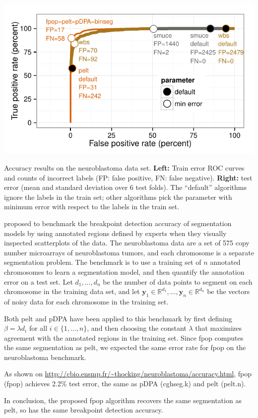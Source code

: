 \documentclass{article}
\newcommand{\RR}{\mathbb R}
\begin{document}
\begin{table}
  \centering
  \parbox{3.5in}{
    \includegraphics[width=\linewidth]{figure-neuroblastoma-roc}
  }
  \parbox{3in}{
    
  }
  \caption{Accuracy results on the neuroblastoma data set.
    \textbf{Left:} 
    Train error ROC curves and counts of incorrect labels
    (FP: false positive, FN: false negative).
    \textbf{Right:} 
    test error (mean and standard deviation over 6 test folds). 
    The ``default'' algorithms ignore the labels in the train set; 
    other algorithms pick the parameter with minimum error with respect
    to the labels in the train set.}
  \label{tab:neuroblastoma-test-error}
\end{table}

\citet{HOCKING-breakpoints} proposed to benchmark the breakpoint
detection accuracy of segmentation models by using annotated regions
defined by experts when they visually inspected scatterplots of the
data. The neuroblastoma data are a set of 575 copy number microarrays
of neuroblastoma tumors, and each chromosome is a separate
segmentation problem. The benchmark is to use a training set of $n$
annotated chromosomes to learn a segmentation model, and then quantify
the annotation error on a test set. Let $d_1, \dots, d_n$ be the
number of data points to segment on each chromosome in the training
data set, and let $\mathbf y_1\in\RR^{d_1}, \dots, \mathbf
y_n\in\RR^{d_n}$ be the vectors of noisy data for each chromosome in
the training set.

Both pelt and pDPA have been applied to this benchmark by first
defining $\beta = \lambda d_i$ for all $i\in\{1, \dots, n\}$, and then
choosing the constant $\lambda$ that maximizes agreement with the
annotated regions in the training set. Since fpop computes the same
segmentation as pelt, we expected the same error rate for
fpop on the neuroblastoma benchmark.

As shown on
\url{http://cbio.ensmp.fr/~thocking/neuroblastoma/accuracy.html}, fpop
(fpop) achieves 2.2\% test error, the same as pDPA (cghseg.k) and pelt
(pelt.n).

In conclusion, the proposed fpop algorithm recovers the same
segmentation as pelt, so has the same breakpoint detection
accuracy.





\end{document}
